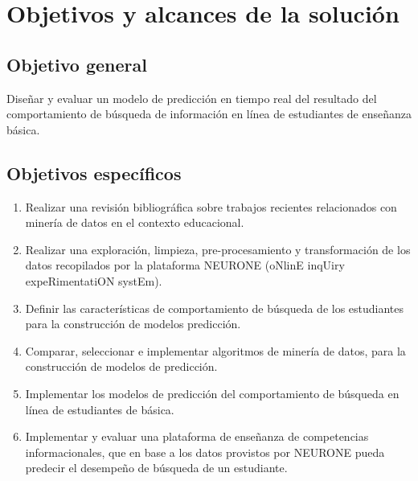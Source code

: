 \chapter{Objetivos y alcances de la solución}
\label{chp:objetivos}
\setcounter{page}{1}

\section{Objetivo general}
\label{sec:objetivo-general}
Diseñar y evaluar un modelo de predicción en tiempo real del resultado del comportamiento de búsqueda de información en línea de estudiantes de enseñanza básica.


\section{Objetivos específicos}
\label{sec:objetivo-especificos}

\begin{enumerate}
	\item Realizar una revisión bibliográfica sobre trabajos recientes relacionados con minería de datos en el contexto educacional.
	\item Realizar una exploración, limpieza, pre-procesamiento y transformación de los datos recopilados por la plataforma NEURONE (oNlinE inqUiry expeRimentatiON systEm).
	\item Definir las características de comportamiento de búsqueda de los estudiantes para la construcción de modelos predicción.
	\item Comparar, seleccionar e implementar algoritmos de minería de datos, para la construcción de modelos de predicción.
	\item Implementar los modelos de predicción del comportamiento de búsqueda en línea de estudiantes de básica.
	\item Implementar y evaluar una plataforma de enseñanza de competencias informacionales, que en base a los datos provistos por NEURONE pueda predecir el desempeño de búsqueda de un estudiante.
\end{enumerate}